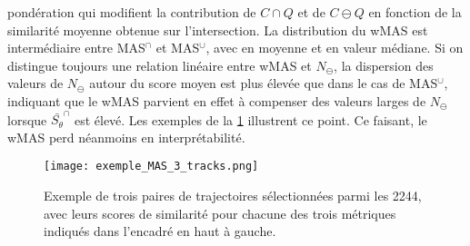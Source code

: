 \documentclass[../main.tex]{subfiles}
\begin{document}
pondération qui modifient la contribution de $C \cap Q$ et de $C \ominus Q$ en fonction de la similarité moyenne obtenue sur l'intersection. La distribution du
wMAS est intermédiaire entre MAS$^\cap$ et MAS$^\cup$, avec  en moyenne et  en valeur médiane. Si on distingue toujours une relation linéaire
entre wMAS et $N_\ominus$, la dispersion des valeurs de $N_\ominus$ autour du score moyen est plus élevée que dans le cas de MAS$^\cup$, indiquant que le wMAS
parvient en effet à compenser des valeurs larges de $N_\ominus$ lorsque $\bar{S_\theta}^\cap$ est élevé. Les exemples de la \cref{fig:exemple_MAS} illustrent ce
point. Ce faisant, le wMAS perd néanmoins en interprétabilité.

\begin{figure}[htb]
    \centering
    \texttt{[image: exemple\_MAS\_3\_tracks.png]}
    \caption{Exemple de trois paires de trajectoires sélectionnées parmi les \num{2244}, avec leurs scores de similarité pour chacune des trois métriques
    indiqués dans l'encadré en haut à gauche.}
    \label{fig:exemple_MAS}
\end{figure}
\end{document}
